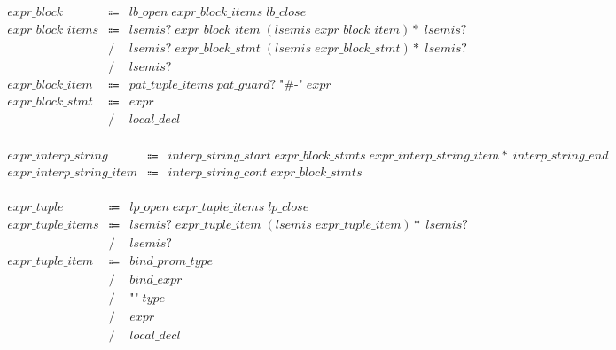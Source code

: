 \begin{align*}
    \begin{array}{rcll}
        \mathit{expr\_block}
        &\Coloneq &\mathit{lb\_open}\; \mathit{expr\_block\_items}\; \mathit{lb\_close} \\
        \mathit{expr\_block\_items}
        &\Coloneq &\mathit{lsemis}{?}\; \mathit{expr\_block\_item}\; (\mathit{lsemis}\; \mathit{expr\_block\_item}){*}\; \mathit{lsemis}{?} \\
        &\mathrel{/} &\mathit{lsemis}{?}\; \mathit{expr\_block\_stmt}\; (\mathit{lsemis}\; \mathit{expr\_block\_stmt}){*}\; \mathit{lsemis}{?} \\
        &\mathrel{/} &\mathit{lsemis}{?} \\
        \mathit{expr\_block\_item}
        &\Coloneq &\mathit{pat\_tuple\_items}\; \mathit{pat\_guard}{?}\; \texttt{"\#-"}\; \mathit{expr} \\
        \mathit{expr\_block\_stmt}
        &\Coloneq &\mathit{expr} \\
        &\mathrel{/} &\mathit{local\_decl}
    \end{array}
\end{align*}

\begin{align*}
    \begin{array}{rcll}
        \mathit{expr\_interp\_string}
        &\Coloneq &\mathit{interp\_string\_start}\; \mathit{expr\_block\_stmts}\; \mathit{expr\_interp\_string\_item}{*}\; \mathit{interp\_string\_end} \\
        \mathit{expr\_interp\_string\_item}
        &\Coloneq &\mathit{interp\_string\_cont}\; \mathit{expr\_block\_stmts}
    \end{array}
\end{align*}

\begin{align*}
    \begin{array}{rcll}
        \mathit{expr\_tuple}
        &\Coloneq &\mathit{lp\_open}\; \mathit{expr\_tuple\_items}\; \mathit{lp\_close} \\
        \mathit{expr\_tuple\_items}
        &\Coloneq &\mathit{lsemis}{?}\; \mathit{expr\_tuple\_item}\; (\mathit{lsemis}\; \mathit{expr\_tuple\_item}){*}\; \mathit{lsemis}{?} \\
        &\mathrel{/} &\mathit{lsemis}{?} \\
        \mathit{expr\_tuple\_item}
        &\Coloneq &\mathit{bind\_prom\_type} \\
        &\mathrel{/} &\mathit{bind\_expr} \\
        &\mathrel{/} &\texttt{"\^{}"}\; \mathit{type} \\
        &\mathrel{/} &\mathit{expr} \\
        &\mathrel{/} &\mathit{local\_decl}
    \end{array}
\end{align*}

